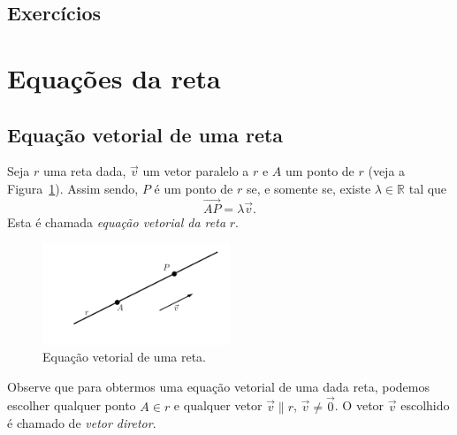 \subsection*{Exercícios}

\emconstrucao

\section{Equações da reta}\label{cap_ert_sec_eqsreta}

\subsection{Equação vetorial de uma reta}

Seja $r$ uma reta dada, $\vec{v}$ um vetor paralelo a $r$ e $A$ um ponto de $r$ (veja a Figura~\ref{fig:er_vet}). Assim sendo, $P$ é um ponto de $r$ se, e somente se, existe $\lambda\in\mathbb{R}$ tal que
\begin{equation}
  \overrightarrow{AP} = \lambda\vec{v}.
\end{equation}
Esta é chamada \emph{equação vetorial da reta} $r$.

\begin{figure}[H]
  \centering
  \includegraphics[width=0.5\textwidth]{./cap_er/dados/fig_er_vet/fig_er_vet}
  \caption{Equação vetorial de uma reta.}
  \label{fig:er_vet}
\end{figure}

Observe que para obtermos uma equação vetorial de uma dada reta, podemos escolher qualquer ponto $A\in r$ e qualquer vetor $\vec{v}\parallel r$, $\vec{v}\neq\vec{0}$. O vetor $\vec{v}$ escolhido é chamado de \emph{vetor diretor}.

